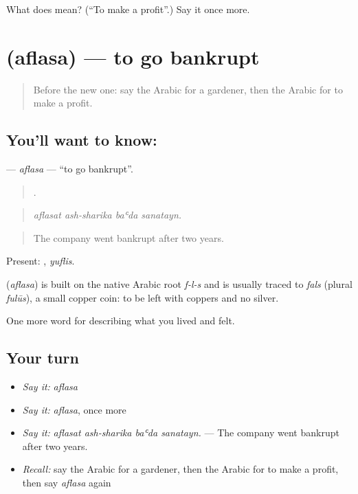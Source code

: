 \begin{tcolorbox}[breakable,colback=teal!4,colframe=teal!35!black,title={Before you move on}]
What does  mean? (\textquotedblleft{}To make a profit\textquotedblright{}.) Say it once more.
\end{tcolorbox}
\section[\texorpdfstring{\ar{أفلس} (aflasa)}{أفلس (aflasa)}]{ (aflasa) — to go bankrupt}

\label{lesson:AR-C527-aflasa}



\begin{quote}
Before the new one: say the Arabic for a gardener, then the Arabic for to make a profit.
\end{quote}

\subsection*{You'll want to know: }
\textbf{} — \emph{aflasa} — \textquotedblleft{}to go bankrupt\textquotedblright{}.

\begin{quote}
   .
\end{quote}

\begin{quote}
\emph{aflasat ash-sharika baʿda sanatayn.}
\end{quote}

\begin{quote}
The company went bankrupt after two years.
\end{quote}

Present: , \emph{yuflis}.

\begin{cousinweb}
\textbf{} (\emph{aflasa}) is built on the native Arabic root \emph{f-l-s} and is usually traced to \emph{fals} (plural \emph{fulūs}), a small copper coin: to be left with coppers and no silver.
\end{cousinweb}

\begin{grammarlens}[title={What you've built}]
One more word for describing what you lived and felt.
\end{grammarlens}

\subsection*{Your turn}
\begin{itemize}
\raggedright
  \item \emph{Say it:} \emph{aflasa}
  \item \emph{Say it:} \emph{aflasa}, once more
  \item \emph{Say it:} \emph{aflasat ash-sharika baʿda sanatayn.} — The company went bankrupt after two years.
  \item \emph{Recall:} say the Arabic for a gardener, then the Arabic for to make a profit, then say \emph{aflasa} again
\end{itemize}

